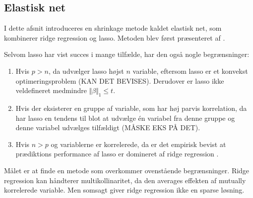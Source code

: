 \subsection{Elastisk net}
I dette afsnit introduceres en shrinkage metode kaldet elastisk net, som kombinerer ridge regression og lasso.
Metoden blev først præsenteret af \citep{zou_hastie}.

Selvom lasso har vist succes i mange tilfælde, har den også nogle begrænsninger:
%
\begin{enumerate}[label=\textnormal{(\arabic*)}]
    \item Hvis $p>n$, da udvælger lasso højst $n$ variable, eftersom lasso er et konvekst optimeringsproblem (KAN DET BEVISES). Derudover er lasso ikke veldefineret medmindre \(\Vert \beta \Vert_1 \leq t\). \label{itm:1}
    \item Hvis der eksisterer en gruppe af variable, som har høj parvis korrelation, da har lasso en tendens til blot at udvælge  én variabel fra denne gruppe og denne variabel udvælges tilfældigt (MÅSKE EKS PÅ DET). \label{itm:2}
    \item Hvis $n>p$ og variablerne er korrelerede, da er det empirisk bevist at prædiktions performance af lasso er domineret af ridge regression \citep{lasso}.  \label{itm:3}
\end{enumerate}
%
Målet er at finde en metode som overkommer ovenstående begrænsninger.
Ridge regression kan håndterer multikollinaritet, da den averages effekten af mutually korrelerede variable.
Men somsagt giver ridge regression ikke en sparse løsning.

